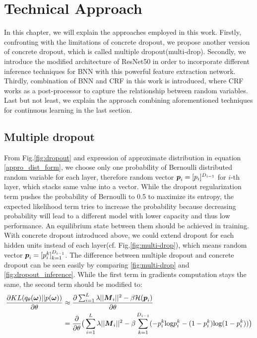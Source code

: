 \chapter{Technical Approach}
In this chapter, we will explain the approaches employed in this work. Firstly, confronting with the limitations of concrete dropout, we propose another version of concrete dropout, which is called multiple dropout(multi-drop). Secondly, we introduce the modified architecture of ResNet50 in order to incorporate different inference techniques for BNN with this powerful feature extraction network. Thirdly, combination of BNN and CRF in this work is introduced, where CRF works as a post-processor to capture the relationship between random variables. Last but not least, we explain the approach combining aforementioned techniques for continuous learning in the last section.

\section{Multiple dropout}
From Fig.\ref{fig:dropout} and expression of approximate distribution in equation \ref{appro_dist_form}, we choose only one probability of Bernoulli distributed random variable for each layer, therefore random vector $\boldsymbol p_i = [p_i]^{D_{i-1}}$ for $i$-th layer, which stacks same value into a vector. While the dropout regularization term pushes the probability of Bernoulli to 0.5 to maximize its entropy, the expected likelihood term tries to increase the probability because decreasing probability will lead to a different model with lower capacity and thus low performance. An equilibrium state between them should be achieved in training. With concrete dropout introduced above, we could extend dropout for each hidden units instead of each layer(cf. Fig.\ref{fig:multi-drop}), which means random vector $\boldsymbol p_i = [p_i^k]_{k=1}^{D_{i-1}}$. The difference between multiple dropout and concrete dropout can be seen easily by comparing \ref{fig:multi-drop} and \ref{fig:dropout_inference}. While the first term in gradients computation stays the same, the second term should be modified to:
\begin{equation} 
\begin{aligned}\label{KL_grad_multi}
\frac{\partial KL(q_{\theta}(\boldsymbol \omega)||p(\boldsymbol \omega))}{\partial \theta} 
&\approx \frac{\partial \sum_{i=1}^{L}\lambda||\boldsymbol M_{i}||^{2}- \beta \mathcal H(\boldsymbol p_{i})}{\partial \theta}  \\
&= \frac{\partial}{\partial \theta} \big( \sum_{i=1}^{L}\lambda||\boldsymbol M_{i}||^{2}- \beta \sum_{k=1}^{D_{i-1}}(-p_i^k\text{log}p_i^k - (1-p_i^k)\text{log}(1-p_i^k))\big)
\end{aligned}
\end{equation}  


